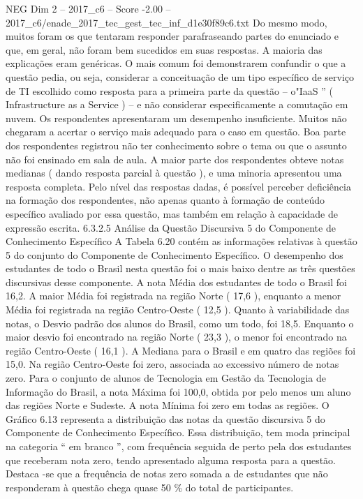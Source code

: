 \begin{textsample}{NEG Dim 2 – 2017\_c6 – Score -2.00 – 2017\_c6/enade\_2017\_tec\_gest\_tec\_inf\_d1e30f89c6.txt}
Do mesmo modo, muitos foram os que tentaram responder parafraseando partes do enunciado e que, em geral, não foram bem sucedidos em suas respostas.
A maioria das explicações eram genéricas.
O mais comum foi demonstrarem confundir o que a questão pedia, ou seja, considerar a conceituação de um tipo específico de serviço de TI escolhido como resposta para a primeira parte da questão – o"IaaS ” ( Infrastructure as a Service ) – e não considerar especificamente a comutação em nuvem.
Os respondentes apresentaram um desempenho insuficiente.
Muitos não chegaram a acertar o serviço mais adequado para o caso em questão.
Boa parte dos respondentes registrou não ter conhecimento sobre o tema ou que o assunto não foi ensinado em sala de aula.
A maior parte dos respondentes obteve notas medianas ( dando resposta parcial à questão ), e uma minoria apresentou uma resposta completa.
Pelo nível das respostas dadas, é possível perceber deficiência na formação dos respondentes, não apenas quanto à formação de conteúdo específico avaliado por essa questão, mas também em relação à capacidade de expressão escrita. 6.3.2.5 Análise da Questão Discursiva 5 do Componente de Conhecimento Específico A Tabela 6.20 contém as informações relativas à questão 5 do conjunto do Componente de Conhecimento Específico.
O desempenho dos estudantes de todo o Brasil nesta questão foi o mais baixo dentre as três questões discursivas desse componente.
A nota Média dos estudantes de todo o Brasil foi 16,2.
A maior Média foi registrada na região Norte ( 17,6 ), enquanto a menor Média foi registrada na região Centro-Oeste ( 12,5 ).
Quanto à variabilidade das notas, o Desvio padrão dos alunos do Brasil, como um todo, foi 18,5.
Enquanto o maior desvio foi encontrado na região Norte ( 23,3 ), o menor foi encontrado na região Centro-Oeste ( 16,1 ).
A Mediana para o Brasil e em quatro das regiões foi 15,0.
Na região Centro-Oeste foi zero, associada ao excessivo número de notas zero.
Para o conjunto de alunos de Tecnologia em Gestão da Tecnologia de Informação do Brasil, a nota Máxima foi 100,0, obtida por pelo menos um aluno das regiões Norte e Sudeste.
A nota Mínima foi zero em todas as regiões.
O Gráfico 6.13 representa a distribuição das notas da questão discursiva 5 do Componente de Conhecimento Específico.
Essa distribuição, tem moda principal na categoria “ em branco ”, com frequência seguida de perto pela dos estudantes que receberam nota zero, tendo apresentado alguma resposta para a questão.
Destaca -se que a frequência de notas zero somada a de estudantes que não responderam à questão chega quase 50 \% do total de participantes.

\end{textsample}
